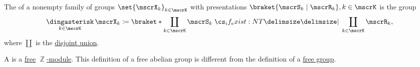 \begin{definition}\label{def:group_free_product}
  The  of a nonempty family of groups \( \set{ \mscrX_k }_{k \in \mscrK} \) with presentations \( \braket{\mscrS_k \mid \mscrR_k}, k \in \mscrK \) is the group
  \begin{equation*}
    \Ast_{k \in \mscrK} \mscrX_k \coloneqq \braket*{ \coprod_{k \in \mscrK} \mscrS_k \given* \coprod_{k \in \mscrK} \mscrR_k },
  \end{equation*}
  where \( \coprod \) is the \hyperref[def:disjoint_union]{disjoint union}.
\end{definition}

\begin{definition}\label{def:free_abelian_group}
  A  is a \hyperref[def:free_left_module]{free} \hyperref[thm:abelian_group_iff_z_module]{\( \BbbZ \)-module}. This definition of a free abelian group is different from the definition of a \hyperref[def:free_group]{free group}.
\end{definition}
